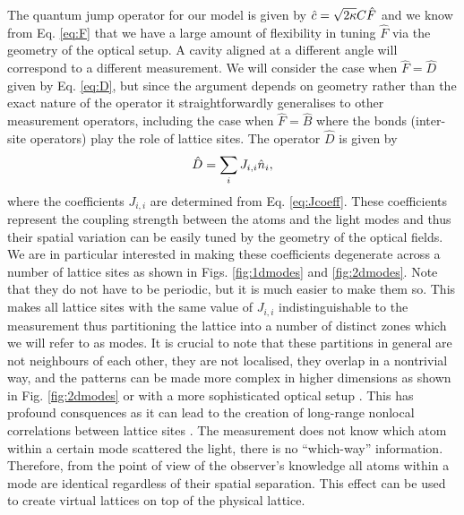 The quantum jump operator for our model is given by
$\hat{c} = \sqrt{2 \kappa} C \hat{F}$ and we know from Eq. \eqref{eq:F}
that we have a large amount of flexibility in tuning $\hat{F}$ via the
geometry of the optical setup. A cavity aligned at a different angle
will correspond to a different measurement. We will consider the case
when $\hat{F} = \hat{D}$ given by Eq. \eqref{eq:D}, but since the
argument depends on geometry rather than the exact nature of the
operator it straightforwardly generalises to other measurement
operators, including the case when $\hat{F} = \hat{B}$ where the bonds
(inter-site operators) play the role of lattice sites. The operator
$\hat{D}$ is given by
\begin{equation}
  \hat{D} = \sum_i J_{i,i} \hat{n}_i,
\end{equation}
where the coefficients $J_{i,i}$ are determined from
Eq. \eqref{eq:Jcoeff}. These coefficients represent the coupling
strength between the atoms and the light modes and thus their spatial
variation can be easily tuned by the geometry of the optical
fields. We are in particular interested in making these coefficients
degenerate across a number of lattice sites as shown in
Figs. \ref{fig:1dmodes} and \ref{fig:2dmodes}. Note that they do not
have to be periodic, but it is much easier to make them so. This makes
all lattice sites with the same value of $J_{i,i}$ indistinguishable
to the measurement thus partitioning the lattice into a number of
distinct zones which we will refer to as modes. It is crucial to note
that these partitions in general are not neighbours of each other,
they are not localised, they overlap in a nontrivial way, and the
patterns can be made more complex in higher dimensions as shown in
Fig. \ref{fig:2dmodes} or with a more sophisticated optical setup
\cite{caballero2016}. This has profound consquences as it can lead to
the creation of long-range nonlocal correlations between lattice sites
\cite{mazzucchi2016, kozlowski2016zeno}. The measurement does not know
which atom within a certain mode scattered the light, there is no
``which-way'' information. Therefore, from the point of view of the
observer's knowledge all atoms within a mode are identical regardless
of their spatial separation. This effect can be used to create virtual
lattices on top of the physical lattice.

